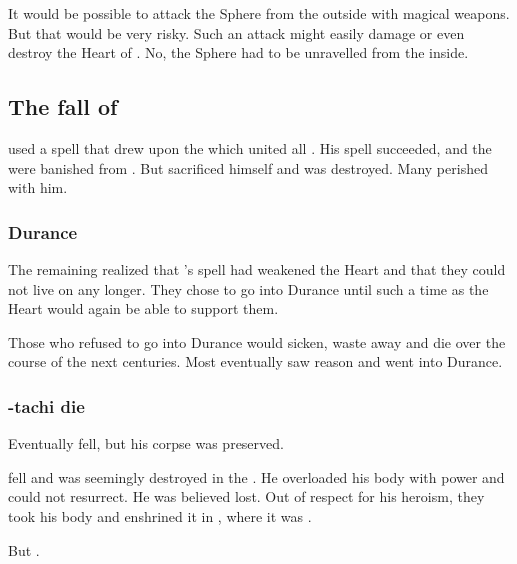 It would be possible to attack the Sphere from the outside with magical weapons. 
But that would be very risky. 
Such an attack might easily damage or even destroy the Heart of \Miith. 
No, the Sphere had to be unravelled from the inside. 









\subsection{The fall of \Sethicus}
\Sethicus used a spell that drew upon the \matrix which united all \dragons.
His spell succeeded, and the \banes were banished from \Miith. 
But \Sethicus sacrificed himself and was destroyed. 
Many \dragons perished with him.





\subsubsection{Durance}
The remaining \dragons realized that \Sethicus's spell had weakened the Heart and that they could not live on \Miith any longer.
They chose to go into Durance until such a time as the Heart would again be able to support them. 

Those \dragons who refused to go into Durance would sicken, waste away and die over the course of the next centuries. 
Most \dragons eventually saw reason and went into Durance. 





\subsubsection{\Sethicus-tachi die}
Eventually \Sethicus fell, but his corpse was preserved.

\Sethicus fell and was seemingly destroyed in the \firstbanewar.
He overloaded his body with power and could not resurrect.
He was believed lost.
Out of respect for his heroism, they took his body and enshrined it in , where it was . 

But .






